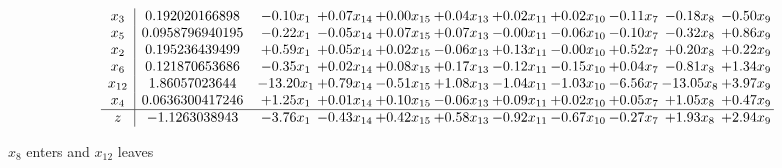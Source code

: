 \documentclass[9pt]{article}
\begin{document}
 \[\begin{array}{c| c c@{\hskip 2pt} c@{\hskip 2pt} c@{\hskip 2pt} c@{\hskip 2pt} c@{\hskip 2pt} c@{\hskip 2pt} c@{\hskip 2pt} c@{\hskip 2pt} c@{\hskip 2pt} }
 x_{3}   &  0.192020166898 & -0.10 x_{1} & +  0.07 x_{14} & +  0.00 x_{15} & +  0.04 x_{13} & +  0.02 x_{11} & +  0.02 x_{10} & -0.11 x_{7} & -0.18 x_{8} & -0.50 x_{9}\\
 x_{5}   &  0.0958796940195 & -0.22 x_{1} & -0.05 x_{14} & +  0.07 x_{15} & +  0.07 x_{13} & -0.00 x_{11} & -0.06 x_{10} & -0.10 x_{7} & -0.32 x_{8} & +  0.86 x_{9}\\
 x_{2}   &  0.195236439499 & +  0.59 x_{1} & +  0.05 x_{14} & +  0.02 x_{15} & -0.06 x_{13} & +  0.13 x_{11} & -0.00 x_{10} & +  0.52 x_{7} & +  0.20 x_{8} & +  0.22 x_{9}\\
 x_{6}   &  0.121870653686 & -0.35 x_{1} & +  0.02 x_{14} & +  0.08 x_{15} & +  0.17 x_{13} & -0.12 x_{11} & -0.15 x_{10} & +  0.04 x_{7} & -0.81 x_{8} & +  1.34 x_{9}\\
 x_{12}   &  1.86057023644 & -13.20 x_{1} & +  0.79 x_{14} & -0.51 x_{15} & +  1.08 x_{13} & -1.04 x_{11} & -1.03 x_{10} & -6.56 x_{7} & -13.05 x_{8} & +  3.97 x_{9}\\
 x_{4}   &  0.0636300417246 & +  1.25 x_{1} & +  0.01 x_{14} & +  0.10 x_{15} & -0.06 x_{13} & +  0.09 x_{11} & +  0.02 x_{10} & +  0.05 x_{7} & +  1.05 x_{8} & +  0.47 x_{9}\\
\hline
z    &  -1.1263038943 & -3.76 x_{1} & -0.43 x_{14} & +  0.42 x_{15} & +  0.58 x_{13} & -0.92 x_{11} & -0.67 x_{10} & -0.27 x_{7} & +  1.93 x_{8} & +  2.94 x_{9}\\
\end{array}\]


 $ x_{8} $ enters and $ x_{12} $ leaves 
\end{document}
